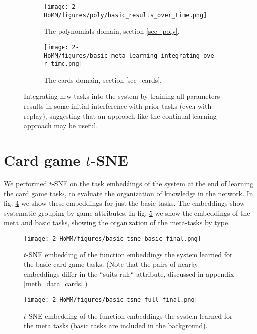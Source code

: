 \begin{figure}[H]
\centering
\begin{subfigure}[t]{0.5\textwidth}
\texttt{[image: 2-HoMM/figures/poly/basic\_results\_over\_time.png]}
\caption{The polynomials domain, section \ref{sec_poly}.}
\label{supp_poly_integration_results}
\end{subfigure}%
\begin{subfigure}[t]{0.5\textwidth}
\texttt{[image: 2-HoMM/figures/basic\_meta\_learning\_integrating\_over\_time.png]}
\caption{The cards domain, section \ref{sec_cards}.}
\label{supp_cards_integration_results}
\end{subfigure}%
\caption{Integrating new tasks into the system by training all parameters results in some initial interference with prior tasks (even with replay), suggesting that an approach like the continual learning-approach may be useful.}
\label{supp_integration_results}
\end{figure}

\section{Card game $t$-SNE} \label{app_cards_tsne}
We performed $t$-SNE \citep{LaurensvanderMaaten2008} on the task embeddings of the system at the end of learning the card game tasks, to evaluate the organization of knowledge in the network. In fig. \ref{fig_cards_tsne_basic} we show these embeddings for just the basic tasks. The embeddings show systematic grouping by game attributes. In fig. \ref{fig_cards_tsne_full} we show the embeddings of the meta and basic tasks, showing the organization of the meta-tasks by type. \par 
\begin{figure}[H]
\centering
\texttt{[image: 2-HoMM/figures/basic\_tsne\_basic\_final.png]}
\caption{$t$-SNE embedding of the function embeddings the system learned for the basic card game tasks. (Note that the pairs of nearby embeddings differ in the ``suits rule`` attribute, discussed in appendix \ref{meth_data_cards}.)} 
\label{fig_cards_tsne_basic}
\end{figure}%
\begin{figure}[H]
\centering
\texttt{[image: 2-HoMM/figures/basic\_tsne\_full\_final.png]}
\caption{$t$-SNE embedding of the function embeddings the system learned for the meta tasks (basic tasks are included in the background).} 
\label{fig_cards_tsne_full}
\end{figure}

